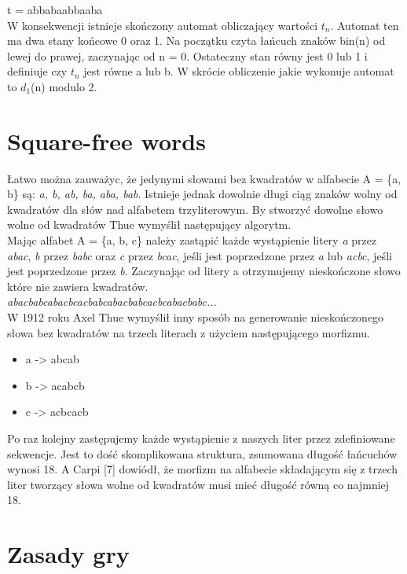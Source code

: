 \documentclass[document]{xmgr}
\begin{document}
\noindent t = abbabaabbaaba\\

W konsekwencji istnieje skończony automat obliczający wartości $t_n$. Automat ten ma dwa stany końcowe 0 oraz 1. Na początku czyta łańcuch znaków bin(n) od lewej do prawej, zaczynając od n = 0. Ostateczny stan równy jest 0 lub 1 i definiuje czy $t_n$ jest równe a lub b. W skrócie obliczenie jakie wykonuje automat to $d_1$(n) modulo 2.


\section{Square-free words}
Łatwo można zauważyc, że jedynymi słowami bez kwadratów w alfabecie A = \{a, b\} są: \emph{a, b, ab, ba, aba, bab}. Istnieje jednak dowolnie długi ciąg znaków wolny od kwadratów dla słów nad alfabetem trzyliterowym. By stworzyć dowolne słowo wolne od kwadratów Thue wymyślił następujący algorytm.\\
Mając alfabet A = \{a, b, c\} należy zastąpić każde wystąpienie litery \emph{a} przez \emph{abac},  \emph{b} przez \emph{babc} oraz \emph{c} przez \emph{bcac}, jeśli jest poprzedzone przez \emph{a} lub \emph{acbc}, jeśli jest poprzedzone przez \emph{b}. Zaczynając od litery a otrzymujemy nieskończone słowo które nie zawiera kwadratów.\\

\emph{abacbabcabacbcacbabcabacbabcacbcabacbabc...}\\

W 1912 roku Axel Thue wymyślił inny sposób na generowanie nieskończonego słowa bez kwadratów na trzech literach z użyciem następującego morfizmu. 
\begin{itemize}
\item a -> abcab
\item b -> acabcb
\item c -> acbcacb
\end{itemize}


Po raz kolejny zastępujemy każde wystąpienie z naszych liter przez zdefiniowane sekwencje. Jest to dość skomplikowana struktura, zsumowana długość łańcuchów wynosi 18. A Carpi [7] dowiódł, że morfizm na alfabecie składającym się z trzech liter tworzący słowa wolne od kwadratów musi mieć długość równą co najmniej 18.


\section{Zasady gry}
\end{document}
